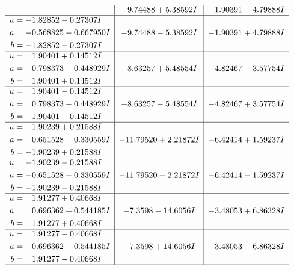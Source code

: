 \documentclass[1p]{elsarticle_modified}
\theoremstyle{definition}
\begin{document}
$$\begin{array}{c|c|c}
 & -9.74488 + 5.38592 I & -1.90391 - 4.79888 I \\ \hline\begin{aligned}
u &= -1.82852 - 0.27307 I \\
a &= -0.568825 - 0.667950 I \\
b &= -1.82852 - 0.27307 I\end{aligned}
 & -9.74488 - 5.38592 I & -1.90391 + 4.79888 I \\ \hline\begin{aligned}
u &= \phantom{-}1.90401 + 0.14512 I \\
a &= \phantom{-}0.798373 + 0.448929 I \\
b &= \phantom{-}1.90401 + 0.14512 I\end{aligned}
 & -8.63257 + 5.48554 I & -4.82467 - 3.57754 I \\ \hline\begin{aligned}
u &= \phantom{-}1.90401 - 0.14512 I \\
a &= \phantom{-}0.798373 - 0.448929 I \\
b &= \phantom{-}1.90401 - 0.14512 I\end{aligned}
 & -8.63257 - 5.48554 I & -4.82467 + 3.57754 I \\ \hline\begin{aligned}
u &= -1.90239 + 0.21588 I \\
a &= -0.651528 + 0.330559 I \\
b &= -1.90239 + 0.21588 I\end{aligned}
 & -11.79520 + 2.21872 I & -6.42414 + 1.59237 I \\ \hline\begin{aligned}
u &= -1.90239 - 0.21588 I \\
a &= -0.651528 - 0.330559 I \\
b &= -1.90239 - 0.21588 I\end{aligned}
 & -11.79520 - 2.21872 I & -6.42414 - 1.59237 I \\ \hline\begin{aligned}
u &= \phantom{-}1.91277 + 0.40668 I \\
a &= \phantom{-}0.696362 + 0.544185 I \\
b &= \phantom{-}1.91277 + 0.40668 I\end{aligned}
 & -7.3598 - 14.6056 I & -3.48053 + 6.86328 I \\ \hline\begin{aligned}
u &= \phantom{-}1.91277 - 0.40668 I \\
a &= \phantom{-}0.696362 - 0.544185 I \\
b &= \phantom{-}1.91277 - 0.40668 I\end{aligned}
 & -7.3598 + 14.6056 I & -3.48053 - 6.86328 I\\
 \hline 
 \end{array}$$\newpage\newpage\renewcommand{\arraystretch}{1}
\end{document}
